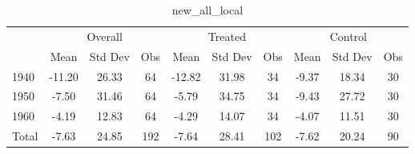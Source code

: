 \begin{table}[htbp]\centering
\def\sym#1{\ifmmode^{#1}\else\(^{#1}\)\fi}
\caption{new\_all\_local \label{tab1}}
\begin{tabular}{l*{3}{ccc}}
\toprule
                    &\multicolumn{3}{c}{Overall}           &\multicolumn{3}{c}{Treated}           &\multicolumn{3}{c}{Control}           \\
                    &        Mean&     Std Dev&         Obs&        Mean&     Std Dev&         Obs&        Mean&     Std Dev&         Obs\\
\midrule
1940                &      -11.20&       26.33&          64&      -12.82&       31.98&          34&       -9.37&       18.34&          30\\
1950                &       -7.50&       31.46&          64&       -5.79&       34.75&          34&       -9.43&       27.72&          30\\
1960                &       -4.19&       12.83&          64&       -4.29&       14.07&          34&       -4.07&       11.51&          30\\
Total               &       -7.63&       24.85&         192&       -7.64&       28.41&         102&       -7.62&       20.24&          90\\
\bottomrule
\end{tabular}
\end{table}
